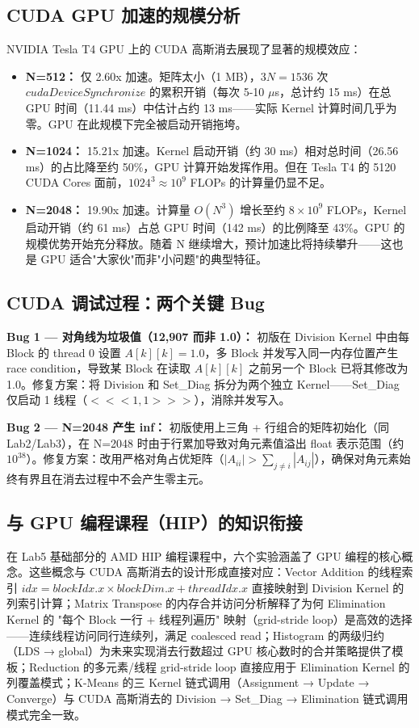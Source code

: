 \documentclass[a4paper]{article}
\begin{document}
\subsection{CUDA GPU 加速的规模分析}

NVIDIA Tesla T4 GPU 上的 CUDA 高斯消去展现了显著的规模效应：
\begin{itemize}
    \item \textbf{N=512：} 仅 2.60x 加速。矩阵太小（1 MB），$3N = 1536$ 次 $cudaDeviceSynchronize$ 的累积开销（每次 5-10 $\mu$s，总计约 15 ms）在总 GPU 时间（11.44 ms）中估计占约 13 ms——实际 Kernel 计算时间几乎为零。GPU 在此规模下完全被启动开销拖垮。
    \item \textbf{N=1024：} 15.21x 加速。Kernel 启动开销（约 30 ms）相对总时间（26.56 ms）的占比降至约 50\%，GPU 计算开始发挥作用。但在 Tesla T4 的 5120 CUDA Cores 面前，$1024^3 \approx 10^9$ FLOPs 的计算量仍显不足。
    \item \textbf{N=2048：} 19.90x 加速。计算量 $O(N^3)$ 增长至约 $8 \times 10^9$ FLOPs，Kernel 启动开销（约 61 ms）占总 GPU 时间（142 ms）的比例降至 43\%。GPU 的规模优势开始充分释放。随着 N 继续增大，预计加速比将持续攀升——这也是 GPU 适合"大家伙"而非"小问题"的典型特征。
\end{itemize}

\subsection{CUDA 调试过程：两个关键 Bug}

\textbf{Bug 1 — 对角线为垃圾值（12,907 而非 1.0）：} 初版在 Division Kernel 中由每 Block 的 thread 0 设置 $A[k][k] = 1.0$，多 Block 并发写入同一内存位置产生 race condition，导致某 Block 在读取 $A[k][k]$ 之前另一个 Block 已将其修改为 1.0。修复方案：将 Division 和 Set\_Diag 拆分为两个独立 Kernel——Set\_Diag 仅启动 1 线程（$<<<1,1>>>$），消除并发写入。

\textbf{Bug 2 — N=2048 产生 inf：} 初版使用上三角 + 行组合的矩阵初始化（同 Lab2/Lab3），在 N=2048 时由于行累加导致对角元素值溢出 float 表示范围（约 $10^{38}$）。修复方案：改用严格对角占优矩阵（$|A_{ii}| > \sum_{j \neq i} |A_{ij}|$），确保对角元素始终有界且在消去过程中不会产生零主元。

\subsection{与 GPU 编程课程（HIP）的知识衔接}

在 Lab5 基础部分的 AMD HIP 编程课程中，六个实验涵盖了 GPU 编程的核心概念。这些概念与 CUDA 高斯消去的设计形成直接对应：Vector Addition 的线程索引 $idx = blockIdx.x \times blockDim.x + threadIdx.x$ 直接映射到 Division Kernel 的列索引计算；Matrix Transpose 的内存合并访问分析解释了为何 Elimination Kernel 的 "每个 Block 一行 + 线程列遍历" 映射（grid-stride loop）是高效的选择——连续线程访问同行连续列，满足 coalesced read；Histogram 的两级归约（LDS → global）为未来实现消去行数超过 GPU 核心数时的合并策略提供了模板；Reduction 的多元素/线程 grid-stride loop 直接应用于 Elimination Kernel 的列覆盖模式；K-Means 的三 Kernel 链式调用（Assignment → Update → Converge）与 CUDA 高斯消去的 Division → Set\_Diag → Elimination 链式调用模式完全一致。
\end{document}
